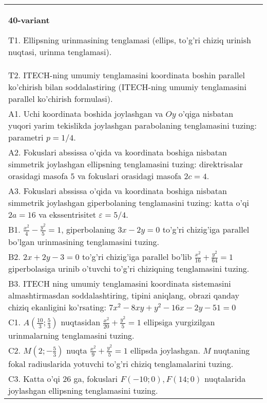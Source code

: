 \documentclass{article}
\begin{document}
\begin{tabular}{m{17cm}}
\textbf{40-variant}
\newline

T1. Ellipsning urinmasining tenglamasi (ellips, to'g'ri chiziq urinish nuqtasi, urinma tenglamasi).\\

T2. ITECH-ning umumiy tenglamasini koordinata boshin parallel ko'chirish bilan soddalastiring (ITECH-ning umumiy tenglamasini parallel ko'chirish formulasi).\\

A1. Uchi koordinata boshida joylashgan va $Oy$ o'qiga nisbatan yuqori yarim tekislikda joylashgan parabolaning tenglamasini tuzing: parametri $p=1/4$.\\

A2. Fokuslari abssissa o'qida va koordinata boshiga nisbatan simmetrik joylashgan ellipsning tenglamasini tuzing: direktrisalar orasidagi masofa $5$ va fokuslari orasidagi masofa $2c=4$.\\

A3. Fokuslari abssissa o'qida va koordinata boshiga nisbatan simmetrik joylashgan giperbolaning tenglamasini tuzing: katta o'qi $2a=16$ va ekssentrisitet $\varepsilon=5/4$.\\

B1. $\frac{x^{2}}{4} - \frac{y^{2}}{5} = 1$, giperbolaning $3x - 2y = 0$ to'g'ri chizig'iga parallel bo'lgan urinmasining tenglamasini tuzing.  \\

B2. $2x + 2y - 3 = 0$ to'g'ri chizig'iga parallel bo'lib $\frac{x^{2}}{16} + \frac{y^{2}}{64} = 1$ giperbolasiga urinib o'tuvchi to'g'ri chiziqning tenglamasini tuzing.  \\

B3. ITECH ning umumiy tenglamasini koordinata sistemasini almashtirmasdan soddalashtiring, tipini aniqlang, obrazi qanday chiziq ekanligini ko'rsating: $7x^{2} - 8xy + y^{2} - 16x - 2y - 51 = 0$\\

C1. $A(\frac{10}{3};\frac{5}{3})$ nuqtasidan $\frac{x^{2}}{20} + \frac{y^{2}}{5} = 1$ ellipsiga yurgizilgan urinmalarning tenglamasini tuzing.  \\

C2. $M(2; - \frac{5}{3})$ nuqta $\frac{x^{2}}{9} + \frac{y^{2}}{5} = 1$ ellipsda joylashgan. $M$ nuqtaning fokal radiuslarida yotuvchi to'g'ri chiziq tenglamalarini tuzing.  \\

C3. Katta o'qi 26 ga, fokuslari $F( - 10;0), F(14;0)$ nuqtalarida joylashgan ellipsning tenglamasini tuzing.  \\

\end{tabular}
\vspace{1cm}
\end{document}
